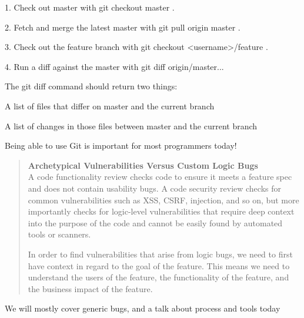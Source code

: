 \documentclass[Screen16to9,17pt]{foils}
\begin{document}
\begin{list2}
\item[1.] Check out master with git checkout master .
\item[2.] Fetch and merge the latest master with git pull origin master .
\item[3.] Check out the feature branch with git checkout <username>/feature .
\item[4.] Run a diff against the master with git diff origin/master...
\end{list2}

The git diff command should return two things:
\begin{list2}
\item A list of files that differ on master and the current branch
\item A list of changes in those files between master and the current branch
\end{list2}

Being able to use Git is important for most programmers today!




\begin{quote}{\bf
Archetypical Vulnerabilities Versus Custom Logic Bugs}\\
A code functionality review checks code to ensure it meets a feature spec and does not contain usability bugs. A code security review checks for common vulnerabilities such as XSS, CSRF, injection, and so on, but more importantly checks for logic-level vulnerabilities that require deep context into the purpose of the code and cannot be easily found by automated tools or scanners.

In order to find vulnerabilities that arise from logic bugs, we need to first have context in regard to the goal of the feature. This means we need to understand the users of the feature, the functionality of the feature, and the business impact of the feature.
\end{quote}

\begin{list2}
\item We will mostly cover generic bugs, and a talk about process and tools today
\end{list2}

\end{document}
